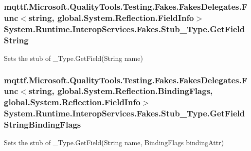 \hypertarget{class_system_1_1_runtime_1_1_interop_services_1_1_fakes_1_1_stub___type_ad2217e00a94482c0ec42edd726a4766e}{
\subsubsection[{Get\-Field\-String}]{\setlength{\rightskip}{0pt plus 5cm}mqttf.\-Microsoft.\-Quality\-Tools.\-Testing.\-Fakes.\-Fakes\-Delegates.\-Func$<$string, global.\-System.\-Reflection.\-Field\-Info$>$ System.\-Runtime.\-Interop\-Services.\-Fakes.\-Stub\-\_\-\-Type.\-Get\-Field\-String}}\label{class_system_1_1_runtime_1_1_interop_services_1_1_fakes_1_1_stub___type_ad2217e00a94482c0ec42edd726a4766e}


Sets the stub of \-\_\-\-Type.\-Get\-Field(\-String name)

\hypertarget{class_system_1_1_runtime_1_1_interop_services_1_1_fakes_1_1_stub___type_a0a77e76c217ff638b38b9055d1e82b6b}{
\subsubsection[{Get\-Field\-String\-Binding\-Flags}]{\setlength{\rightskip}{0pt plus 5cm}mqttf.\-Microsoft.\-Quality\-Tools.\-Testing.\-Fakes.\-Fakes\-Delegates.\-Func$<$string, global.\-System.\-Reflection.\-Binding\-Flags, global.\-System.\-Reflection.\-Field\-Info$>$ System.\-Runtime.\-Interop\-Services.\-Fakes.\-Stub\-\_\-\-Type.\-Get\-Field\-String\-Binding\-Flags}}\label{class_system_1_1_runtime_1_1_interop_services_1_1_fakes_1_1_stub___type_a0a77e76c217ff638b38b9055d1e82b6b}


Sets the stub of \-\_\-\-Type.\-Get\-Field(\-String name, Binding\-Flags binding\-Attr)

